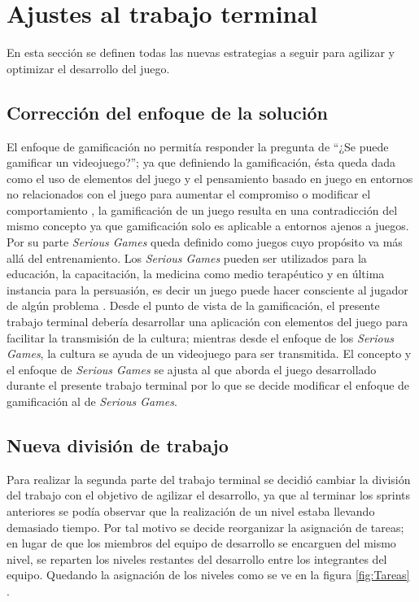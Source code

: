 \section{Ajustes al trabajo terminal}
En esta sección se definen todas las nuevas estrategias a seguir para agilizar y
optimizar el desarrollo del juego.

\subsection{Corrección del enfoque de la solución}
El enfoque de gamificación no permitía responder la pregunta de “¿Se puede 
gamificar un videojuego?”; ya que definiendo la gamificación, ésta queda dada 
como el uso de
elementos del juego y el pensamiento basado en juego en entornos no relacionados
con el juego para aumentar el compromiso o modificar el comportamiento
\cite{RefIntroGamificacion}, la gamificación de un juego resulta en una contradicción
del mismo concepto ya que gamificación solo es aplicable a entornos ajenos a
juegos. Por su parte \textit{Serious Games} queda definido como juegos cuyo
propósito va más allá del entrenamiento\cite{Ref:Serious}. Los
\textit{Serious Games} pueden ser utilizados para la educación, la capacitación,
la medicina como medio terapéutico y en última instancia para la persuasión, es
decir un juego puede hacer consciente al jugador de algún problema
\cite{ferreira2002serious}. Desde el punto de vista de la gamificación, el 
presente trabajo terminal debería desarrollar una aplicación con elementos 
del juego para facilitar la transmisión de la cultura; mientras desde el enfoque 
de los \textit{Serious Games}, la cultura se ayuda de un videojuego para ser 
transmitida. El concepto y el enfoque de \textit{Serious Games} se ajusta al 
que aborda el juego desarrollado durante el presente trabajo terminal por lo que 
se decide modificar el enfoque de gamificación al de \textit{Serious Games}.


\subsection{Nueva división de trabajo} \label{Sec:AsignacionTrabajo}
Para realizar la segunda parte del trabajo terminal se decidió cambiar la división
del trabajo con el objetivo de agilizar el desarrollo, ya que al terminar los sprints
anteriores se podía observar que la realización de un nivel estaba llevando
demasiado tiempo. Por tal motivo se decide reorganizar la asignación de
tareas; en lugar de que los miembros del equipo de desarrollo se encarguen del
mismo nivel, se reparten los niveles restantes del desarrollo entre los
integrantes del equipo. Quedando la asignación de los niveles como se ve en la
figura \ref{fig:Tareas} .

